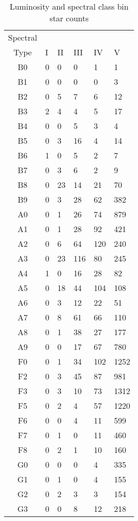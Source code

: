 \begin{table}[t]
    \scriptsize
    \centering
    \caption{Luminosity and spectral class bin star counts}
    \begin{tabular}{c|lllll}
    \toprule
    Spectral & & & & & \\
    Type & I & II & III & IV & V \\ \midrule
    B0 & 0 & 0 & 0 & 1 & 1 \\
    B1 & 0 & 0 & 0 & 0 & 3 \\
    B2 & 0 & 5 & 7 & 6 & 12 \\
    B3 & 2 & 4 & 4 & 5 & 17 \\
    B4 & 0 & 0 & 5 & 3 & 4 \\
    B5 & 0 & 3 & 16 & 4 & 14 \\
    B6 & 1 & 0 & 5 & 2 & 7 \\
    B7 & 0 & 3 & 6 & 2 & 9 \\
    B8 & 0 & 23 & 14 & 21 & 70 \\
    B9 & 0 & 3 & 28 & 62 & 382 \\
    A0 & 0 & 1 & 26 & 74 & 879 \\
    A1 & 0 & 1 & 28 & 92 & 421 \\
    A2 & 0 & 6 & 64 & 120 & 240 \\
    A3 & 0 & 23 & 116 & 80 & 245 \\
    A4 & 1 & 0 & 16 & 28 & 82 \\
    A5 & 0 & 18 & 44 & 104 & 108 \\
    A6 & 0 & 3 & 12 & 22 & 51 \\
    A7 & 0 & 8 & 61 & 66 & 110 \\
    A8 & 0 & 1 & 38 & 27 & 177 \\
    A9 & 0 & 0 & 17 & 67 & 780 \\
    F0 & 0 & 1 & 34 & 102 & 1252 \\
    F2 & 0 & 3 & 45 & 87 & 981 \\
    F3 & 0 & 3 & 10 & 73 & 1312 \\
    F5 & 0 & 2 & 4 & 57 & 1220 \\
    F6 & 0 & 0 & 4 & 11 & 599 \\
    F7 & 0 & 1 & 0 & 11 & 460 \\
    F8 & 0 & 2 & 1 & 10 & 160 \\
    G0 & 0 & 0 & 0 & 4 & 335 \\
    G1 & 0 & 1 & 0 & 4 & 155 \\
    G2 & 0 & 2 & 3 & 3 & 154 \\
    G3 & 0 & 0 & 8 & 12 & 218 \\

\end{tabular}
\end{table}
